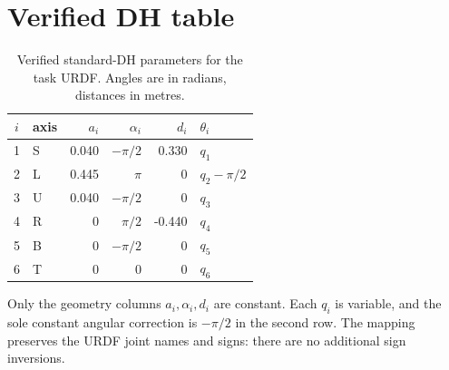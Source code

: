 \section{Verified DH table}
\begin{table}[htbp]
\centering
\caption{Verified standard-DH parameters for the task URDF. Angles are in
radians, distances in metres.}
\label{tab:dh}
\begin{tabular}{c l r r r l}
\toprule $i$ & axis & $a_i$ & $\alpha_i$ & $d_i$ & $\theta_i$\\\midrule
1&S&0.040&$-\pi/2$&0.330&$q_1$\\
2&L&0.445&$\pi$&0&$q_2-\pi/2$\\
3&U&0.040&$-\pi/2$&0&$q_3$\\
4&R&0&$\pi/2$&-0.440&$q_4$\\
5&B&0&$-\pi/2$&0&$q_5$\\
6&T&0&0&0&$q_6$\\\bottomrule
\end{tabular}
\end{table}

Only the geometry columns $a_i,\alpha_i,d_i$ are constant. Each $q_i$ is
variable, and the sole constant angular correction is $-\pi/2$ in the second
row. The mapping preserves the URDF joint names and signs: there are no
additional sign inversions.

